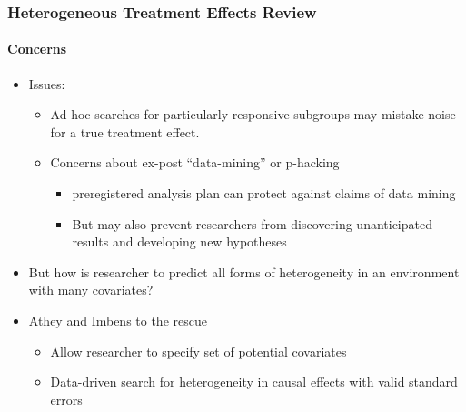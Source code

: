 \documentclass[
  shownotes,
  xcolor={svgnames},
  hyperref={colorlinks,citecolor=DarkBlue,linkcolor=DarkRed,urlcolor=DarkBlue}
  , aspectratio=169]{beamer}
\begin{document}
\begin{frame}[fragile]
\frametitle{Heterogeneous Treatment Effects Review}

\framesubtitle{Concerns}

\begin{itemize}
  \item Issues:
  
  \begin{itemize}
  \item Ad hoc searches for particularly responsive subgroups may mistake noise for a true treatment effect. 
  
  \item Concerns about ex-post “data-mining” or  p-hacking
    \begin{itemize}
      \item preregistered analysis plan can protect against claims of data mining  
      \item But may also prevent researchers from discovering unanticipated results and developing new hypotheses
    \end{itemize}
  \end{itemize}
\medskip
\item But how is researcher to predict all forms of heterogeneity in an environment with many covariates?
\medskip
\item Athey and Imbens to the rescue
\begin{itemize}
  \item Allow researcher to specify set of potential covariates
  \item Data-driven search for heterogeneity in causal effects with valid standard errors
\end{itemize}


\end{itemize}


\end{frame}



\end{document}
